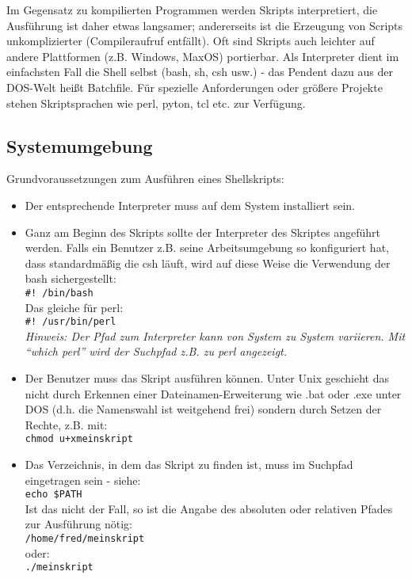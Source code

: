 \documentclass[11pt]{article}
\begin{document}
Im Gegensatz zu kompilierten Programmen werden Skripts interpretiert,
die Ausführung ist daher etwas langsamer; andererseits ist die
Erzeugung von Scripts unkomplizierter (Compileraufruf entfällt). Oft
sind Skripts auch leichter auf andere Plattformen (z.B. Windows,
MaxOS) portierbar. Als Interpreter dient im einfachsten Fall die Shell
selbst (bash, sh, csh usw.) - das Pendent dazu aus der DOS-Welt heißt
Batchfile. Für spezielle Anforderungen oder größere Projekte stehen
Skriptsprachen wie perl, pyton, tcl etc. zur Verfügung.

\subsection{Systemumgebung}
Grundvoraussetzungen zum Ausführen eines Shellskripts:
\begin{itemize}
\item Der entsprechende Interpreter muss auf dem System installiert sein.
\item Ganz am Beginn des Skripts sollte der Interpreter des Skriptes
  angeführt werden. Falls ein Benutzer z.B. seine Arbeitsumgebung so
  konfiguriert hat, dass standardmäßig die csh läuft, wird auf diese
  Weise die Verwendung der bash sichergestellt:\\
  \texttt{\#! /bin/bash}\\
  Das gleiche für perl:\\
  \texttt{\#! /usr/bin/perl}\\
  \textit{Hinweis: Der Pfad zum Interpreter kann von System zu System
    variieren. Mit ``which perl'' wird der Suchpfad z.B. zu perl
    angezeigt.}
\item Der Benutzer muss das Skript ausführen können. Unter Unix
  geschieht das nicht durch Erkennen einer Dateinamen-Erweiterung wie
  .bat oder .exe unter DOS (d.h. die Namenswahl ist weitgehend frei)
  sondern durch Setzen der Rechte, z.B. mit: \\
  \texttt{chmod u+xmeinskript}
\item Das Verzeichnis, in dem das Skript zu finden ist, muss im
  Suchpfad eingetragen sein - siehe: \\
  \texttt{echo \$PATH}\\
  Ist das nicht der Fall, so ist die Angabe des absoluten oder
  relativen Pfades zur Ausführung nötig:\\
  \texttt{/home/fred/meinskript}\\
  oder:\\
  \texttt{./meinskript}
\end{itemize}
\end{document}
